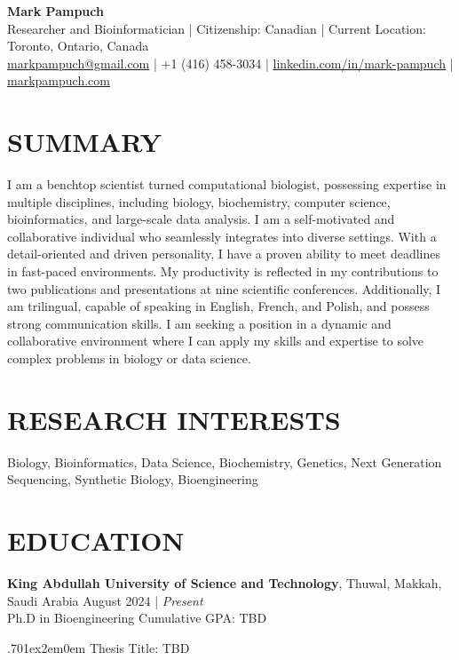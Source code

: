 \documentclass[a4paper,9pt]{extarticle}
\begin{document}
\pagestyle{fancy}
\renewcommand{\headrulewidth}{0pt}
\fancyhead{}
\thispagestyle{empty} %

\begin{flushleft}
	\textbf{\huge Mark Pampuch}\\[2pt] 
	Researcher and Bioinformatician | Citizenship: Canadian | Current Location: Toronto, Ontario, Canada
	\\ \href{mailto:markpampuch@gmail.com}{markpampuch@gmail.com} | +1 (416) 458-3034 | \href{https://www.linkedin.com/in/mark-pampuch/}{linkedin.com/in/mark-pampuch} | \href{https://markpampuch.com}{markpampuch.com} 
\end{flushleft}

\section*{SUMMARY}
\noindent
I am a benchtop scientist turned computational biologist, possessing expertise in multiple disciplines, including biology, biochemistry, computer science, bioinformatics, and large-scale data analysis. I am a self-motivated and collaborative individual who seamlessly integrates into diverse settings. With a detail-oriented and driven personality, I have a proven ability to meet deadlines in fast-paced environments. My productivity is reflected in my contributions to two publications and presentations at nine scientific conferences. Additionally, I am trilingual, capable of speaking in English, French, and Polish, and possess strong communication skills. I am seeking a position in a dynamic and collaborative environment where I can apply my skills and expertise to solve complex problems in biology or data science.

\section*{RESEARCH INTERESTS}
\noindent
Biology, Bioinformatics, Data Science, Biochemistry, Genetics, Next Generation Sequencing, Synthetic Biology, Bioengineering

\section*{EDUCATION}
\noindent
\begin{minipage}{1\textwidth}
\textbf{King Abdullah University of Science and Technology}, Thuwal, Makkah, Saudi Arabia \hfill August 2024 | \textit{Present}\\ 
Ph.D in Bioengineering \hfill Cumulative GPA: TBD \par %
{\hsize.70\linewidth\parskip1ex\hangindent2em\parindent0em 
	\setlength{\parskip}{0pt} %
Thesis Title: TBD\par}
\end{minipage}
\vspace{\parskip}
\end{document}

